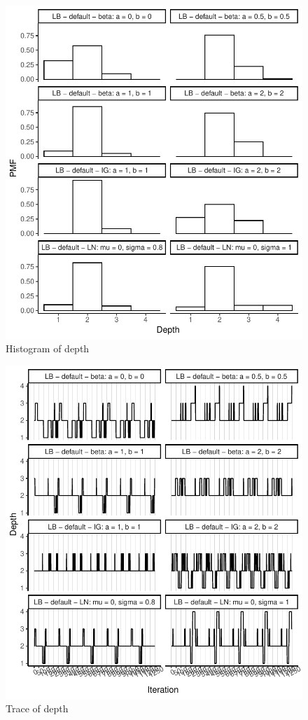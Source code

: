 \documentclass{amsart}
\begin{document}
%
\begin{figure}[ht]
	\centering
	\includegraphics[width=0.95\linewidth]{hist_depth_2.pdf}
	\caption{Histogram of depth}
	\label{fig:hist:depth:2}
\end{figure}

\begin{figure}[ht]
	\centering
	\includegraphics[width=0.95\linewidth]{trace_depth_2.pdf}
	\caption{Trace of depth}
	\label{fig:trace:depth:2}
\end{figure}
\end{document}
